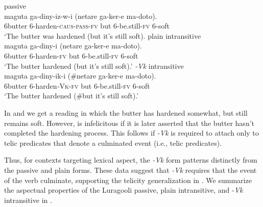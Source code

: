 \documentclass[output=paper]{langsci/lanmgscibook}
\begin{document}
\ea\label{ex:gluckman:15} 
  \ea\label{ex:gluckman:15a}
  {{passive}}\\
  \gll maguta  ga-diny-iz-w-i                     (netare ga-ker-e       ma-doto).\\
      6butter  6-harden-\textsc{caus}-\textsc{pass}-\textsc{fv}       but      6-be.still-\textsc{fv} 6-soft\\
  \glt ‘The butter was hardened (but it’s still soft).
  \ex\label{ex:gluckman:15b}
  {{plain intransitive}}\\
  \gll maguta ga-diny-i      (netare ga-ker-e       ma-doto).\\
      6butter 6-harden-\textsc{fv}   but     6-be.still-\textsc{fv}  6-soft\\
  \glt ‘The butter hardened (but it’s still soft).’
  \ex\label{ex:gluckman:15c}
  {{\textit{-Vk}}{ intransitive}}\\
  \gll maguta ga-diny-ik-i        (\#netare ga-ker-e       ma-doto).\\
      6butter 6-harden\textit{-}\textsc{Vk}-\textsc{fv}     but      6-be.still-\textsc{fv} 6-soft\\
  \glt ‘The butter hardened (\#but it’s still soft).’
  \z
\z

In  and  we get a reading in which the butter has hardened somewhat, but still remains soft. However,  is infelicitous if it is later asserted that the butter hasn’t completed the hardening process. This follows if \textit{-Vk} is required to attach only to telic predicates that denote a culminated event (i.e., telic predicates).

Thus, for contexts targeting lexical aspect, the \textit{-Vk} form patterns distinctly from the passive and plain forms. These data suggest that \textit{-Vk} requires that the event of the verb culminate, supporting the telicity generalization in . We summarize the aspectual properties of the Luragooli passive, plain intransitive, and -\textit{Vk} intransitive in . 

\begin{table}
\caption{Lexical aspect properties of passive, plain intransitive and \textit{-Vk} intransitive}
\label{tab:gluckman:3}

\end{table}
\end{document}
